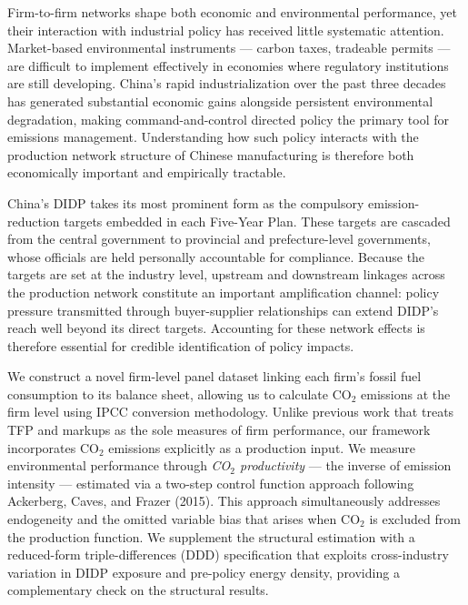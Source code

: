 \documentclass[11pt,a4paper]{article}
\begin{document}
Firm-to-firm networks shape both economic and environmental performance, yet their interaction with industrial policy has received little systematic attention. Market-based environmental instruments --- carbon taxes, tradeable permits --- are difficult to implement effectively in economies where regulatory institutions are still developing. China's rapid industrialization over the past three decades has generated substantial economic gains alongside persistent environmental degradation, making command-and-control directed policy the primary tool for emissions management. Understanding how such policy interacts with the production network structure of Chinese manufacturing is therefore both economically important and empirically tractable.

China's DIDP takes its most prominent form as the compulsory emission-reduction targets embedded in each Five-Year Plan. These targets are cascaded from the central government to provincial and prefecture-level governments, whose officials are held personally accountable for compliance. Because the targets are set at the industry level, upstream and downstream linkages across the production network constitute an important amplification channel: policy pressure transmitted through buyer-supplier relationships can extend DIDP's reach well beyond its direct targets. Accounting for these network effects is therefore essential for credible identification of policy impacts.

We construct a novel firm-level panel dataset linking each firm's fossil fuel consumption to its balance sheet, allowing us to calculate CO$_2$ emissions at the firm level using IPCC conversion methodology. Unlike previous work that treats TFP and markups as the sole measures of firm performance, our framework incorporates CO$_2$ emissions explicitly as a production input. We measure environmental performance through \emph{CO$_2$ productivity} --- the inverse of emission intensity --- estimated via a two-step control function approach following Ackerberg, Caves, and Frazer (2015). This approach simultaneously addresses endogeneity and the omitted variable bias that arises when CO$_2$ is excluded from the production function. We supplement the structural estimation with a reduced-form triple-differences (DDD) specification that exploits cross-industry variation in DIDP exposure and pre-policy energy density, providing a complementary check on the structural results.
\end{document}
